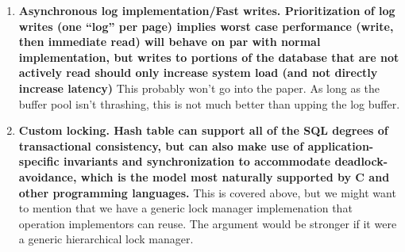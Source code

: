 \documentclass[letterpaper,twocolumn,english]{article}
\newcommand{\yad}{Lemon\xspace}
\begin{document}
\begin{enumerate}
%
%
%
%
%
  \item {\bf Asynchronous log implementation/Fast
  writes. Prioritization of log writes (one {}``log'' per page)
  implies worst case performance (write, then immediate read) will
  behave on par with normal implementation, but writes to portions of
  the database that are not actively read should only increase system
  load (and not directly increase latency)} This probably won't go
  into the paper.  As long as the buffer pool isn't thrashing, this is
  not much better than upping the log buffer.

  \item {\bf Custom locking. Hash table can support all of the SQL
  degrees of transactional consistency, but can also make use of
  application-specific invariants and synchronization to accommodate
  deadlock-avoidance, which is the model most naturally supported by C
  and other programming languages.}  This is covered above, but we
  might want to mention that we have a generic lock manager
  implemenation that operation implementors can reuse.  The argument
  would be stronger if it were a generic hierarchical lock manager.


\end{enumerate}
\end{document}
